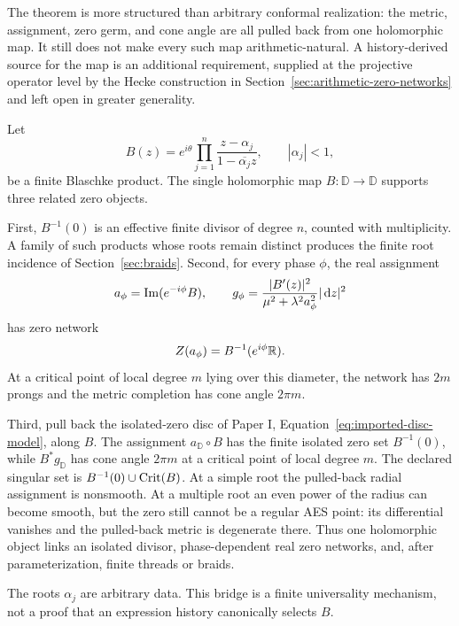 \begin{remark}
The theorem is more structured than arbitrary conformal realization: the metric,
assignment, zero germ, and cone angle are all pulled back from one holomorphic map.
It still does not make every such map arithmetic-natural.  A history-derived
source for the map is an additional requirement, supplied at the projective
operator level by the Hecke construction in
Section~\ref{sec:arithmetic-zero-networks} and left open in greater generality.
\end{remark}

\begin{example}
\label{ex:blaschke-bridge}
Let
\[
 B(z)=e^{i\theta}\prod_{j=1}^n
 \frac{z-\alpha_j}{1-\overline{\alpha_j}z},
 \qquad |\alpha_j|<1,
\]
be a finite Blaschke product.  The single holomorphic map $B:\mathbb D\to
\mathbb D$ supports three related zero objects.

First, $B^{-1}(0)$ is an effective finite divisor of degree $n$, counted with
multiplicity.  A family of such products whose roots remain distinct produces the
finite root incidence of Section~\ref{sec:braids}.  Second, for every phase
$\phi$, the real assignment
\[
 a_\phi=\operatorname{Im}(e^{-i\phi}B),
 \qquad
 g_\phi=
 \frac{|B'(z)|^2}{\mu^2+\lambda^2a_\phi^2}|\,\mathrm{d} z|^2
\]
has zero network
\[
 Z(a_\phi)=B^{-1}(e^{i\phi}\mathbb{R}).
\]
At a critical point of local degree $m$ lying over this diameter, the network has
$2m$ prongs and the metric completion has cone angle $2\pi m$.

Third, pull back the isolated-zero disc of Paper I,
Equation~\eqref{eq:imported-disc-model}, along $B$.  The assignment
$a_{\mathbb D}\circ B$ has the finite isolated zero set $B^{-1}(0)$, while
$B^*g_{\mathbb D}$ has cone angle $2\pi m$ at a critical point of local degree
$m$.  The declared singular set is
$B^{-1}(0)\cup\operatorname{Crit}(B)$.  At a simple root the pulled-back radial assignment is
nonsmooth.  At a multiple root an even power of the radius can become smooth, but
the zero still cannot be a regular AES point: its differential vanishes and the
pulled-back metric is degenerate there.  Thus one holomorphic object links an
isolated divisor, phase-dependent real zero networks, and, after parameterization,
finite threads or braids.

The roots $\alpha_j$ are arbitrary data.  This bridge is a finite universality
mechanism, not a proof that an expression history canonically selects $B$.
\end{example}

